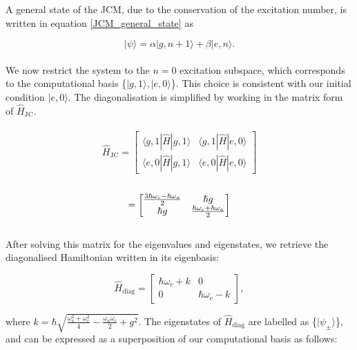 \documentclass[11pt]{article}
\begin{document}
A general state of the JCM, due  to the conservation of the excitation number, is written in equation \eqref{JCM_general_state} as

\begin{equation*}
    |\psi\rangle = \alpha|g,n+1\rangle + \beta|e,n\rangle.
\end{equation*}
\\
We now restrict the system to the $n=0$ excitation subspace, which corresponds to the computational basis \{$|g,1\rangle,|e,0\rangle$\}. This choice is consistent with our initial condition $|e,0\rangle$. The diagonalisation is simplified by working in the matrix form of $\hat{H}_{\scriptscriptstyle \text{JC}}$.\\
\\
\begin{equation*}
    \hat{H}_{\scriptscriptstyle \text{JC}} = 
    \begin{bmatrix}
        \langle g,1|\hat{H}|g,1\rangle & \langle g,1|\hat{H}|e,0\rangle\\
        \langle e,0|\hat{H}|g,1\rangle & \langle e,0|\hat{H}|e,0\rangle
    \end{bmatrix}
\end{equation*}
\\
\begin{equation*}
=
    \begin{bmatrix}
        \large{\frac{3\hbar\omega_c - \hbar\omega_a}{2}} & \small{\hbar g} \\
        \small{\hbar g} & \large{\frac{\hbar\omega_c + \hbar\omega_a}{2}}
    \end{bmatrix}
\end{equation*}
\\
After solving this matrix for the eigenvalues and eigenstates, we retrieve the diagonalised Hamiltonian written in its eigenbasis:

\begin{equation*}
    \hat{H}_{\scriptscriptstyle \text{diag}} = 
    \begin{bmatrix}
        \hbar\omega_c + k & 0 \\
        0 & \hbar\omega_c - k
    \end{bmatrix},
\end{equation*}

where $k = \hbar\sqrt{\frac{\omega_a^2 + \omega_c^2}{4} - \frac{\omega_a\omega_c}{2} + g^2}$. The eigenstates of $\hat{H}_{\scriptscriptstyle \text{diag}}$ are labelled as \{$|\psi_\pm\rangle$\}, and can be expressed as a superposition of our computational basis as follows:
\end{document}
